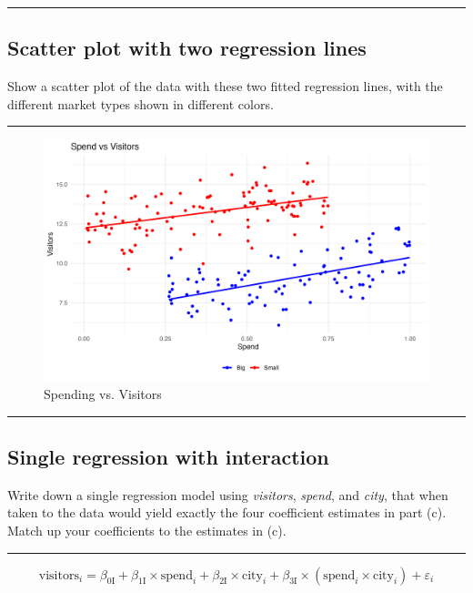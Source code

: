 \documentclass{article}
\newenvironment{colorparagraph}[1]{\par\color{#1}}{\par}
\begin{document}
\begin{colorparagraph}{questioncolor}
\rule{\textwidth}{0.5pt}

\label{q4d}\subsection{Scatter plot with two regression lines}
Show a scatter plot of the data with these two fitted regression lines, with the different market types shown in different colors.

\rule{\textwidth}{0.5pt}
\end{colorparagraph}

\begin{figure}[H]
  \centering
  \includegraphics[width=\textwidth]{marketing_spending_vs_visitors_by_city.png}
  \caption{Spending vs. Visitors}
  \label{fig:your_image_label}
\end{figure}

\begin{colorparagraph}{questioncolor}
\rule{\textwidth}{0.5pt}

\label{q4e}\subsection{Single regression with interaction}
Write down a single regression model using \textit{visitors}, \textit{spend}, and \textit{city}, that when taken to the data would yield exactly the four coefficient estimates in part (c). Match up your coefficients to the estimates in (c).

\rule{\textwidth}{0.5pt}
\end{colorparagraph}

\[
\text{visitors}_i = \beta_{0 \text{I}} + \beta_{1 \text{I}} \times \text{spend}_i + \beta_{2 \text{I}} \times \text{city}_i + \beta_{3 \text{I}} \times (\text{spend}_i \times \text{city}_i) + \varepsilon_i
\]
\end{document}
